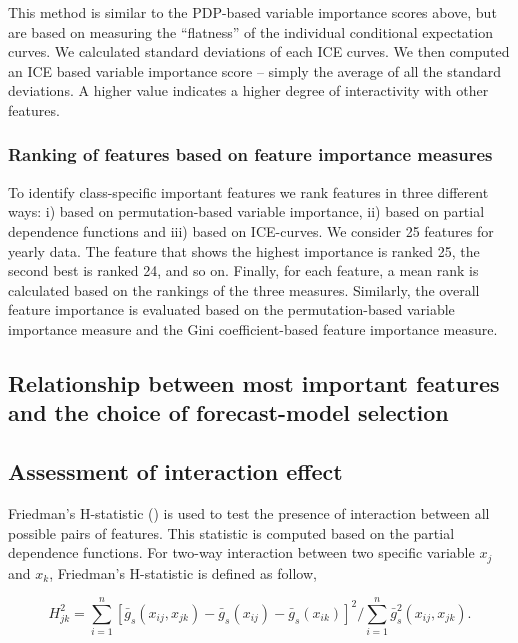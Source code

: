 \documentclass[11pt,a4paper,]{article}
\begin{document}
This method is similar to the PDP-based variable importance scores
above, but are based on measuring the ``flatness'' of the individual
conditional expectation curves. We calculated standard deviations of
each ICE curves. We then computed an ICE based variable importance score
-- simply the average of all the standard deviations. A higher value
indicates a higher degree of interactivity with other features.

\subsubsection{Ranking of features based on feature importance
measures}\label{ranking-of-features-based-on-feature-importance-measures}

To identify class-specific important features we rank features in three
different ways: i) based on permutation-based variable importance, ii)
based on partial dependence functions and iii) based on ICE-curves. We
consider 25 features for yearly data. The feature that shows the highest
importance is ranked 25, the second best is ranked 24, and so on.
Finally, for each feature, a mean rank is calculated based on the
rankings of the three measures. Similarly, the overall feature
importance is evaluated based on the permutation-based variable
importance measure and the Gini coefficient-based feature importance
measure.

\subsection{Relationship between most important features and the choice
of forecast-model
selection}\label{relationship-between-most-important-features-and-the-choice-of-forecast-model-selection}

\subsection{Assessment of interaction
effect}\label{assessment-of-interaction-effect}

Friedman's H-statistic (\textcite{friedman2008predictive}) is used to
test the presence of interaction between all possible pairs of features.
This statistic is computed based on the partial dependence functions.
For two-way interaction between two specific variable \(x_j\) and
\(x_k\), Friedman's H-statistic is defined as follow,

\[H_{jk}^2=\sum_{i=1}^{n}[\bar{g}_{s}(x_{ij}, x_{jk})-\bar{g}_{s}(x_{ij})-\bar{g}_{s}(x_{ik})]^2/\sum_{i=1}^{n}\bar{g}^2_{s}(x_{ij}, x_{jk}).\]
\end{document}
